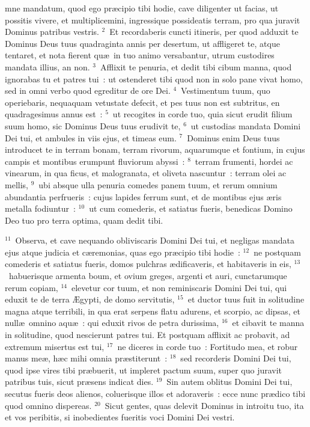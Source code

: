 \bchapter
{}mne mandatum, quod ego pr\ae cipio tibi hodie, cave diligenter ut facias, ut possitis vivere, et multiplicemini, ingressique possideatis terram, pro qua juravit Dominus patribus vestris.
${}^{2}$~Et recordaberis cuncti itineris, per quod adduxit te Dominus Deus tuus quadraginta annis per desertum, ut affligeret te, atque tentaret, et nota fierent qu\ae\ in tuo animo versabantur, utrum custodires mandata illius, an non.
${}^{3}$~Afflixit te penuria, et dedit tibi cibum manna, quod ignorabas tu et patres tui~: ut ostenderet tibi quod non in solo pane vivat homo, sed in omni verbo quod egreditur de ore Dei.
${}^{4}$~Vestimentum tuum, quo operiebaris, nequaquam vetustate defecit, et pes tuus non est subtritus, en quadragesimus annus est~:
${}^{5}$~ut recogites in corde tuo, quia sicut erudit filium suum homo, sic Dominus Deus tuus erudivit te,
${}^{6}$~ut custodias mandata Domini Dei tui, et ambules in viis ejus, et timeas eum.
${}^{7}$~Dominus enim Deus tuus introducet te in terram bonam, terram rivorum, aquarumque et fontium, in cujus campis et montibus erumpunt fluviorum abyssi~:
${}^{8}$~terram frumenti, hordei ac vinearum, in qua ficus, et malogranata, et oliveta nascuntur~: terram olei ac mellis,
${}^{9}$~ubi absque ulla penuria comedes panem tuum, et rerum omnium abundantia perfrueris~: cujus lapides ferrum sunt, et de montibus ejus \ae ris metalla fodiuntur~:
${}^{10}$~ut cum comederis, et satiatus fueris, benedicas Domino Deo tuo pro terra optima, quam dedit tibi.


${}^{11}$~Observa, et cave nequando obliviscaris Domini Dei tui, et negligas mandata ejus atque judicia et c\ae remonias, quas ego pr\ae cipio tibi hodie~:
${}^{12}$~ne postquam comederis et satiatus fueris, domos pulchras \ae dificaveris, et habitaveris in eis,
${}^{13}$~habuerisque armenta boum, et ovium greges, argenti et auri, cunctarumque rerum copiam,
${}^{14}$~elevetur cor tuum, et non reminiscaris Domini Dei tui, qui eduxit te de terra \AE gypti, de domo servitutis,
${}^{15}$~et ductor tuus fuit in solitudine magna atque terribili, in qua erat serpens flatu adurens, et scorpio, ac dipsas, et null\ae\ omnino aqu\ae~: qui eduxit rivos de petra durissima,
${}^{16}$~et cibavit te manna in solitudine, quod nescierunt patres tui. Et postquam afflixit ac probavit, ad extremum misertus est tui,
${}^{17}$~ne diceres in corde tuo~: Fortitudo mea, et robur manus me\ae , h\ae c mihi omnia pr\ae stiterunt~:
${}^{18}$~sed recorderis Domini Dei tui, quod ipse vires tibi pr\ae buerit, ut impleret pactum suum, super quo juravit patribus tuis, sicut pr\ae sens indicat dies.
${}^{19}$~Sin autem oblitus Domini Dei tui, secutus fueris deos alienos, coluerisque illos et adoraveris~: ecce nunc pr\ae dico tibi quod omnino dispereas.
${}^{20}$~Sicut gentes, quas delevit Dominus in introitu tuo, ita et vos peribitis, si inobedientes fueritis voci Domini Dei vestri.

